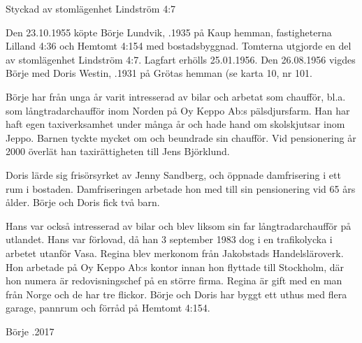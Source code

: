 


%

Styckad av stomlägenhet Lindström 4:7


%
Den 23.10.1955 köpte Börje Lundvik, .1935 på Kaup hemman, fastigheterna Lilland 4:36 och Hemtomt 4:154 med bostadsbyggnad. Tomterna utgjorde en del av stomlägenhet Lindström 4:7. Lagfart erhölls 25.01.1956. Den 26.08.1956 vigdes Börje med Doris Westin, .1931 på Grötas hemman (se karta 10, nr 101.

Börje har från unga år varit intresserad av bilar och arbetat som chaufför, bl.a. som långtradarchaufför inom Norden på Oy Keppo Ab:s pälsdjursfarm. Han har haft egen taxiverksamhet under många år och hade hand om skolskjutsar inom Jeppo. Barnen tyckte mycket om och beundrade sin chaufför. Vid pensionering år 2000 överlät han taxirättigheten till Jens Björklund.

Doris lärde sig frisörsyrket av Jenny Sandberg, och öppnade damfrisering i ett rum i bostaden. Damfriseringen arbetade hon med till sin pensionering vid 65 års ålder. Börje och Doris fick två barn.
\begin{jhchildren}
  \item {}
  \item {}
\end{jhchildren}
Hans var också intresserad av bilar och blev liksom sin far långtradarchaufför på utlandet. Hans var förlovad, då han 3 september 1983 dog i en trafikolycka i arbetet utanför Vasa. Regina blev merkonom från Jakobstads Handelsläroverk. Hon arbetade på Oy Keppo Ab:s kontor innan hon flyttade till Stockholm, där hon numera är redovisningschef på en större firma. Regina är gift med en man från Norge och de har tre flickor. Börje och Doris har byggt ett uthus med flera garage, pannrum och förråd på Hemtomt 4:154.

Börje .2017


